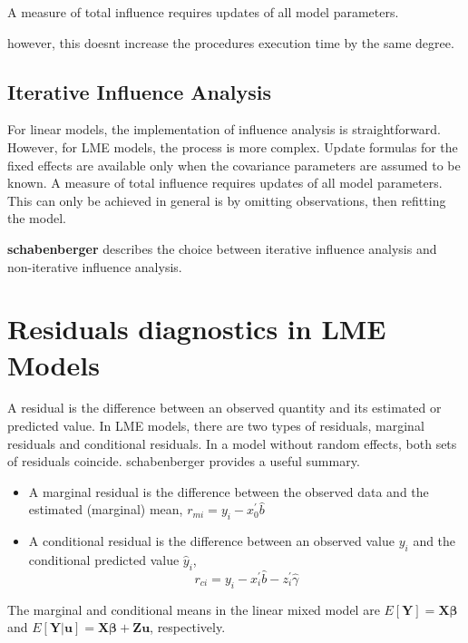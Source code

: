 \documentclass[a4paper,12pt]{article}
\begin{document}
A measure of total influence requires updates of all model parameters.

however, this doesnt increase the procedures execution time by the same degree.
\subsection{Iterative Influence Analysis}

For linear models, the implementation of influence analysis is straightforward.
However, for LME models, the process is more complex. Update formulas for the fixed effects are available only when the covariance parameters are assumed to be known. A measure of total influence requires updates of all model parameters.
This can only be achieved in general is by omitting observations, then refitting the model.

\textbf{schabenberger} describes the choice between  iterative influence analysis and  non-iterative influence analysis.






	\section{Residuals diagnostics in LME Models}
	
	
	A residual is the difference between an observed quantity and its
	estimated or predicted value. In LME models, there are two types
	of residuals, marginal residuals and conditional residuals. 
	In a model without random effects, both sets of residuals coincide. schabenberger provides a useful summary. 
	
	\begin{itemize}
		\item A marginal residual is the difference between the observed data and the estimated (marginal) mean, $r_{mi} = y_i - x_0^{\prime} \hat{b}$
		\item A conditional residual is the difference between an observed value $y_{i}$ and the conditional predicted value $\hat{y}_{i} $,
		\[r_{ci} = y_i - x_i^{\prime} \hat{b} - z_i^{\prime} \hat{\gamma}\]
	\end{itemize} 
	
	The marginal and conditional means in the linear mixed model are
	$E[\boldsymbol{Y}] = \boldsymbol{X}\boldsymbol{\beta}$ and
	$E[\boldsymbol{Y|\boldsymbol{u}}] = \boldsymbol{X}\boldsymbol{\beta} + \boldsymbol{Z}\boldsymbol{u}$, respectively.
	

	








\end{document}
